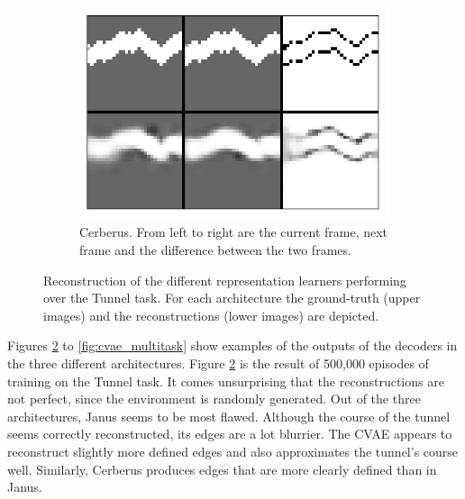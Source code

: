 \begin{figure}[t!]
	
	\begin{subfigure}{0.9\columnwidth}
		\centering
		\includegraphics[width=\linewidth]{img/cerberus_tunnel_recon.png}
		\caption{Cerberus. From left to right are the current frame, next frame and the difference between the two frames.}
		\label{subfig:cerberus_reconstruction}
	\end{subfigure}

	\caption{Reconstruction of the different representation learners performing over the Tunnel task. For each architecture the ground-truth (upper images) and the reconstructions (lower images) are depicted.}
	\label{fig:repr_learner_reconstructions}
\end{figure}

Figures \ref{fig:repr_learner_reconstructions} to \ref{fig:cvae_multitask} show examples of the outputs of the decoders in the three different architectures. Figure \ref{fig:repr_learner_reconstructions} is the result of 500,000 episodes of training on the Tunnel task. It comes unsurprising that the reconstructions are not perfect, since the environment is randomly generated. Out of the three architectures, Janus seems to be most flawed. Although the course of the tunnel seems correctly reconstructed, its edges are a lot blurrier. The CVAE appears to reconstruct slightly more defined edges and also approximates the tunnel's course well. Similarly, Cerberus produces edges that are more clearly defined than in Janus.

